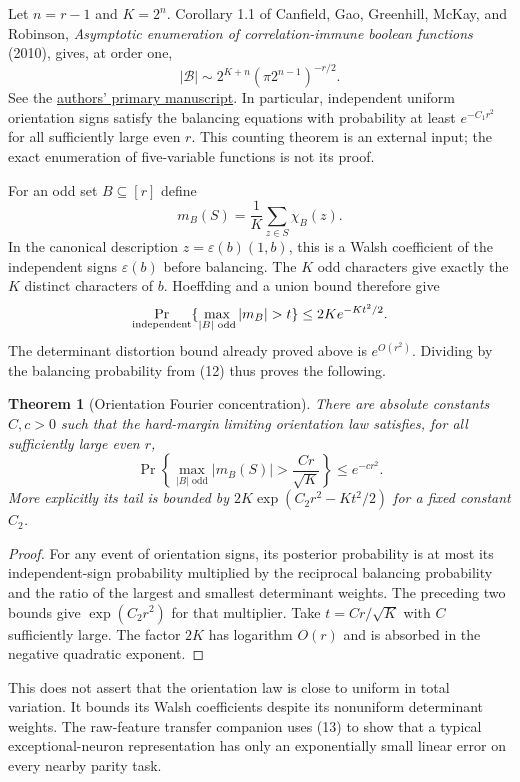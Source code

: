 \documentclass[11pt]{article}
\newtheorem{theorem}{Theorem}\newtheorem{lemma}[theorem]{Lemma}
\begin{document}
Let $n=r-1$ and $K=2^n$. Corollary 1.1 of Canfield, Gao, Greenhill,
McKay, and Robinson, \emph{Asymptotic enumeration of correlation-immune
boolean functions} (2010), gives, at order one,
\[
 |\mathcal B|\sim 2^{K+n}(\pi 2^{n-1})^{-r/2}.
 \tag{12}
\]
See the \href{https://web.maths.unsw.edu.au/~csg/papers/immune.pdf}{authors'
primary manuscript}. In particular, independent uniform orientation
signs satisfy the balancing equations with probability at least
$e^{-C_1r^2}$ for all sufficiently large even $r$. This counting theorem
is an external input; the exact enumeration of five-variable functions
is not its proof.

For an odd set $B\subseteq[r]$ define
\[
 m_B(S)=\frac1K\sum_{z\in S}\chi_B(z).
\]
In the canonical description $z=\varepsilon(b)(1,b)$, this is a Walsh
coefficient of the independent signs $\varepsilon(b)$ before balancing.
The $K$ odd characters give exactly the $K$ distinct characters of $b$.
Hoeffding and a union bound therefore give
\[
 \Pr_{\rm independent}\{\max_{|B|\text{ odd}}|m_B|>t\}
                              \le2K e^{-Kt^2/2}.
\]
The determinant distortion bound already proved above is $e^{O(r^2)}$.
Dividing by the balancing probability from (12) thus proves the following.

\begin{theorem}[Orientation Fourier concentration]
There are absolute constants $C,c>0$ such that the hard-margin limiting
orientation law satisfies, for all sufficiently large even $r$,
\[
 \Pr\left\{\max_{|B|\text{ odd}}|m_B(S)|>
                           \frac{Cr}{\sqrt K}\right\}
                                                    \le e^{-cr^2}.
 \tag{13}
\]
More explicitly its tail is bounded by
$2K\exp(C_2r^2-Kt^2/2)$ for a fixed constant $C_2$.
\end{theorem}
\begin{proof}
For any event of orientation signs, its posterior probability is at most
its independent-sign probability multiplied by the reciprocal balancing
probability and the ratio of the largest and smallest determinant
weights. The preceding two bounds give $\exp(C_2r^2)$ for that multiplier.
Take $t=Cr/\sqrt K$ with $C$ sufficiently large. The factor $2K$ has
logarithm $O(r)$ and is absorbed in the negative quadratic exponent.
\end{proof}

This does not assert that the orientation law is close to uniform in
total variation. It bounds its Walsh coefficients despite its
nonuniform determinant weights. The raw-feature transfer companion uses
(13) to show that a typical exceptional-neuron representation has only
an exponentially small linear error on every nearby parity task.
\end{document}
